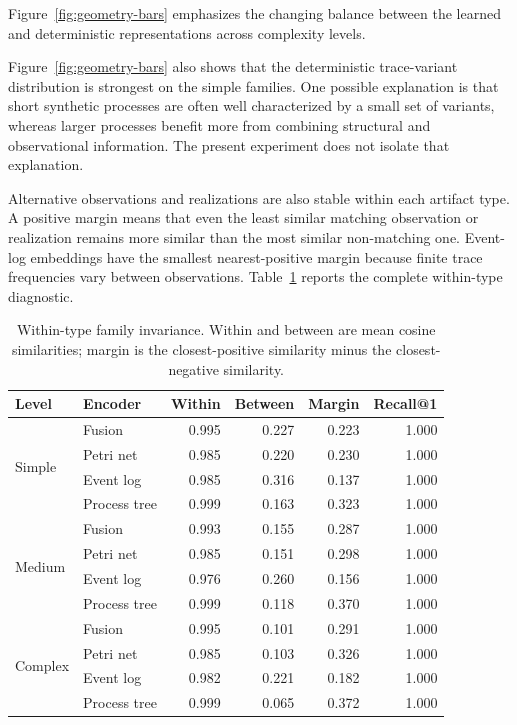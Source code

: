 \documentclass[pdflatex,sn-basic]{sn-jnl}
\begin{document}
Figure~\ref{fig:geometry-bars} emphasizes the changing balance between the learned and deterministic representations across complexity levels.



Figure~\ref{fig:geometry-bars} also shows that the deterministic trace-variant distribution is strongest on the simple families. One possible explanation is that short synthetic processes are often well characterized by a small set of variants, whereas larger processes benefit more from combining structural and observational information. The present experiment does not isolate that explanation.

Alternative observations and realizations are also stable within each artifact type. A positive margin means that even the least similar matching observation or realization remains more similar than the most similar non-matching one. Event-log embeddings have the smallest nearest-positive margin because finite trace frequencies vary between observations. Table~\ref{tab:invariance} reports the complete within-type diagnostic.

\begin{table}[!t]
\centering
\caption{Within-type family invariance. Within and between are mean cosine similarities; margin is the closest-positive similarity minus the closest-negative similarity.}
\label{tab:invariance}
\begin{tabular}{@{}llrrrr@{}}
\toprule
Level & Encoder & Within & Between & Margin & Recall@1 \\
\midrule
\multirow{4}{*}{Simple} & Fusion & 0.995 & 0.227 & 0.223 & 1.000 \\
 & Petri net & 0.985 & 0.220 & 0.230 & 1.000 \\
 & Event log & 0.985 & 0.316 & 0.137 & 1.000 \\
 & Process tree & 0.999 & 0.163 & 0.323 & 1.000 \\
\midrule
\multirow{4}{*}{Medium} & Fusion & 0.993 & 0.155 & 0.287 & 1.000 \\
 & Petri net & 0.985 & 0.151 & 0.298 & 1.000 \\
 & Event log & 0.976 & 0.260 & 0.156 & 1.000 \\
 & Process tree & 0.999 & 0.118 & 0.370 & 1.000 \\
\midrule
\multirow{4}{*}{Complex} & Fusion & 0.995 & 0.101 & 0.291 & 1.000 \\
 & Petri net & 0.985 & 0.103 & 0.326 & 1.000 \\
 & Event log & 0.982 & 0.221 & 0.182 & 1.000 \\
 & Process tree & 0.999 & 0.065 & 0.372 & 1.000 \\
\bottomrule
\end{tabular}
\end{table}
\end{document}
